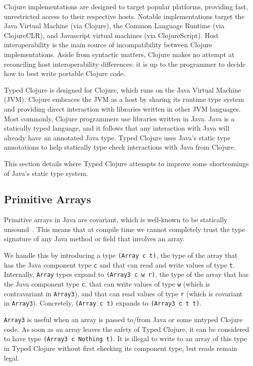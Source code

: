 Clojure implementations are designed to target popular platforms, 
providing fast, unrestricted access to their respective hosts.
Notable implementations target
the Java Virtual Machine (via Clojure), the Common Language Runtime (via ClojureCLR),
and Javascript virtual machines (via ClojureScript). 
Host interoperability is the main source of incompatibility between Clojure implementations.
Aside from syntactic matters, Clojure makes no attempt at reconciling
host interoperability differences:
it is up to the programmer to decide how to best write portable Clojure code.

Typed Clojure is designed for Clojure, which runs on the Java Virtual Machine (JVM).
Clojure embraces the JVM as a host by sharing its runtime type system and providing direct
interaction with libraries written in other JVM languages. Most commonly, Clojure programmers
use libraries written in Java. Java is a statically typed language, and it follows that any interaction with
Java will already have an annotated Java type. Typed Clojure uses Java's static type annotations
to help statically type check interactions with Java from Clojure.

This section details where Typed Clojure attempts to improve some shortcomings of Java's static type system.

\subsection{Primitive Arrays}
\label{designarrays}

Primitive arrays in Java are covariant, which is well-known to be statically unsound~\cite{OW97,BK99}.
This means that at compile time we cannot completely trust the type signature of any Java method or field that involves 
an array.

We handle this by introducing a type \lstinline|(Array c t)|, 
the type of the array that has the Java component type \lstinline|c| 
and that can read and write values of type \lstinline|t|.
Internally, \lstinline|Array| types expand to \lstinline|(Array3 c w r)|,
the type of the array that has the Java component type \lstinline|c|,
that can write values of type \lstinline|w| (which is contravariant in \lstinline|Array3|), 
and that can read values of type \lstinline|r| (which is covariant in \lstinline|Array3|).
Concretely, \lstinline|(Array c t)| expands to \lstinline|(Array3 c t t)|.

\lstinline|Array3| is useful when an array is passed to/from Java or some untyped Clojure code.
As soon as an array leaves the safety of Typed Clojure, it can be considered to have type
\lstinline|(Array3 c Nothing t)|. It is illegal to write to an array of this type in Typed Clojure
without first checking its component type, but reads remain legal.

